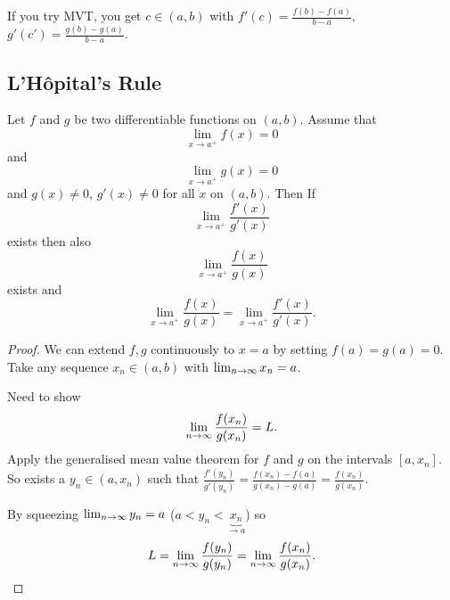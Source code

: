 \documentclass[10pt, a4paper]{article}
\begin{document}
If you try MVT,
you get $c \in (a, b)$ with $f'(c) = \frac{f(b) - f(a)}{b - a}$,
$g'(c') = \frac{g(b) - g(a)}{b - a}$.

\subsection{L'H\^opital's Rule}

\begin{theorem}
    Let $f$ and $g$ be two differentiable functions on $(a, b)$.
    Assume that
    \[
    \lim_{x \rightarrow a ^ {+}}f(x) = 0
    \]
    and
    \[
    \lim_{x \rightarrow a ^ {+}}g(x) = 0
    \]
    and $g(x) \neq 0$,
    $g'(x) \neq 0$ for all $x$ on $(a, b)$.
    Then
    If
    \[
    \lim_{x \rightarrow a ^ {+}}\frac{f'(x)}{g'(x)}
    \]
    exists then also
    \[
    \lim_{x \rightarrow a ^ {+}}\frac{f(x)}{g(x)}
    \]
    exists
    and
    \[
    \lim_{x \rightarrow a ^ {+}}\frac{f(x)}{g(x)} = \lim_{x \rightarrow a ^ {+}}\frac{f'(x)}{g'(x)}.
    \]
    
    \begin{proof}
        We can extend $f, g$ continuously to $x = a$ by setting $f(a) = g(a) = 0$.
        Take any  sequence $x_n \in (a, b)$ with $\lim_{n \rightarrow \infty} x_n = a$.

        Need to show
        \[
        \lim_{n \rightarrow \infty} \frac{f(x_n)}{g(x_n)} = L.
        \]
        Apply the generalised mean value theorem for $f$ and $g$ on the intervals $[a, x_n]$.
        So exists a $y_n \in (a, x_n)$ such that $\frac{f'(y_n)}{g'(y_n)} = \frac{f(x_n) - f(a)}{g(x_n) - g(a)} = \frac{f(x_n)}{g(x_n)}$.

        By squeezing $\lim_{n \rightarrow \infty} y_n = a$
        ($a < y_n < \underbrace{x_n}_{\rightarrow a}$)
        so
        \[
        L = \lim_{n \rightarrow \infty}\frac{f(y_n)}{g(y_n)} = \lim_{n \rightarrow \infty}\frac{f(x_n)}{g(x_n)}.
        \]
    \end{proof}
\end{theorem}
\end{document}

